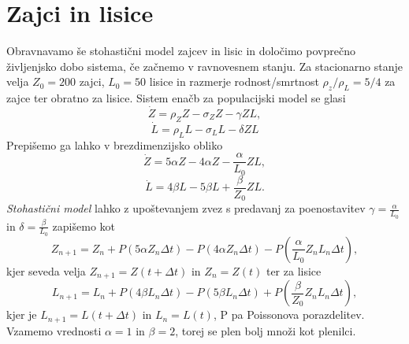 \documentclass[11pt, a4paper]{article}
\begin{document}
 \section{Zajci in lisice}
Obravnavamo še stohastični model zajcev in lisic in določimo povprečno življenjsko dobo sistema, če začnemo v ravnovesnem stanju. Za stacionarno stanje velja $Z_0=200$ zajci, $L_0=50$ lisice in razmerje rodnost/smrtnost $\rho_z/\rho_L=5/4$ za zajce ter obratno za lisice. Sistem enačb za populacijski model se glasi
\begin{equation}
\dot{Z} = \rho_Z Z -\sigma_Z Z - \gamma ZL,
\end{equation}
\begin{equation}
\dot{L} = \rho_L L - \sigma_L L - \delta ZL
\end{equation}
Prepišemo ga lahko v brezdimenzijsko obliko 
\begin{equation}
\dot{Z} = 5\alpha Z - 4\alpha Z - \frac{\alpha}{L_0}ZL,
\end{equation}
\begin{equation}
\dot{L} = 4\beta L - 5\beta L + \frac{\beta}{Z_0}ZL.
\end{equation}
\textit{Stohastični model} lahko z upoštevanjem zvez s predavanj za poenostavitev $\gamma=\frac{\alpha}{L_0}$ in $\delta = \frac{\beta}{L_0}$ zapišemo kot
\begin{equation}
Z_{n+1} = Z_{n} + P(5\alpha Z_n \Delta t) - P(4\alpha Z_n \Delta t) - P(\frac{\alpha}{L_0} Z_n L_n \Delta t),
\end{equation}
kjer seveda velja $Z_{n+1}=Z(t+\Delta t)$ in $Z_n=Z(t)$ ter za lisice
\begin{equation}
L_{n+1} = L_{n} + P(4\beta L_n \Delta t) - P(5\beta L_n \Delta t) + P (\frac{\beta}{Z_0} Z_n L_n \Delta t),
\end{equation}
kjer je $L_{n+1}=L(t+\Delta t)$ in $L_n=L(t)$, P pa Poissonova porazdelitev. Vzamemo vrednosti $\alpha =1$ in $\beta = 2 $, torej se plen bolj množi kot plenilci.
\end{document}
